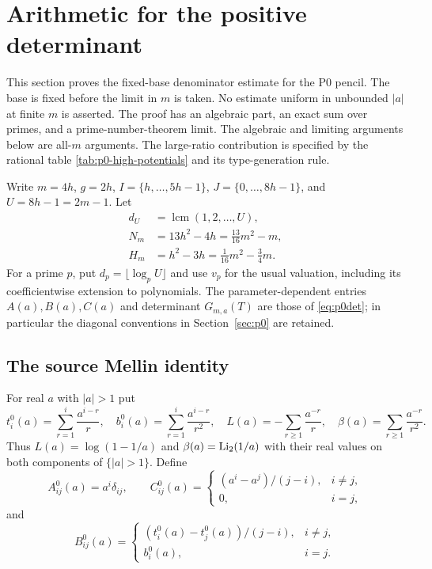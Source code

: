 \section{Arithmetic for the positive determinant}\label{sec:p0-arithmetic}

This section proves the fixed-base denominator estimate for the P0
pencil.  The base is fixed before the limit in $m$ is taken.  No estimate
uniform in unbounded $|a|$ at finite $m$ is asserted.  The proof has an
algebraic part, an exact sum over primes, and a prime-number-theorem limit.
The algebraic and limiting arguments below are all-$m$ arguments.  The
large-ratio contribution is specified by the rational table
\ref{tab:p0-high-potentials} and its type-generation rule.

Write $m=4h$, $g=2h$, $I=\{h,\ldots,5h-1\}$,
$J=\{0,\ldots,8h-1\}$, and $U=8h-1=2m-1$.  Let
\[
 \begin{aligned}
 d_U&=\operatorname{lcm}(1,2,\ldots,U),\\
 N_m&=13h^2-4h=\frac{13}{16}m^2-m,\\
 H_m&=h^2-3h=\frac1{16}m^2-\frac34m.
 \end{aligned}
\]
For a prime $p$, put $d_p=\lfloor\log_p U\rfloor$ and use $v_p$ for the
usual valuation, including its coefficientwise extension to polynomials.
The parameter-dependent entries $A(a),B(a),C(a)$ and determinant
$G_{m,a}(T)$ are those of \eqref{eq:p0det}; in particular the diagonal
conventions in Section~\ref{sec:p0} are retained.

\subsection{The source Mellin identity}
For real $a$ with $|a|>1$ put
\[
 t_i^0(a)=\sum_{r=1}^{i}\frac{a^{i-r}}r,
 \quad b_i^0(a)=\sum_{r=1}^{i}\frac{a^{i-r}}{r^2},
 \quad L(a)=-\sum_{r\ge1}\frac{a^{-r}}r,
 \quad \beta(a)=\sum_{r\ge1}\frac{a^{-r}}{r^2}.
\]
Thus $L(a)=\log(1-1/a)$ and $\beta(a)=\operatorname{Li}_2(1/a)$ with their real
values on both components of $\{|a|>1\}$.  Define
\[
 A^0_{ij}(a)=a^i\delta_{ij},\qquad
 C^0_{ij}(a)=\begin{cases}(a^i-a^j)/(j-i),&i\ne j,\\0,&i=j,\end{cases}
\]
and
\[
 B^0_{ij}(a)=\begin{cases}(t_i^0(a)-t_j^0(a))/(j-i),&i\ne j,\\
 b_i^0(a),&i=j.\end{cases}
\]

